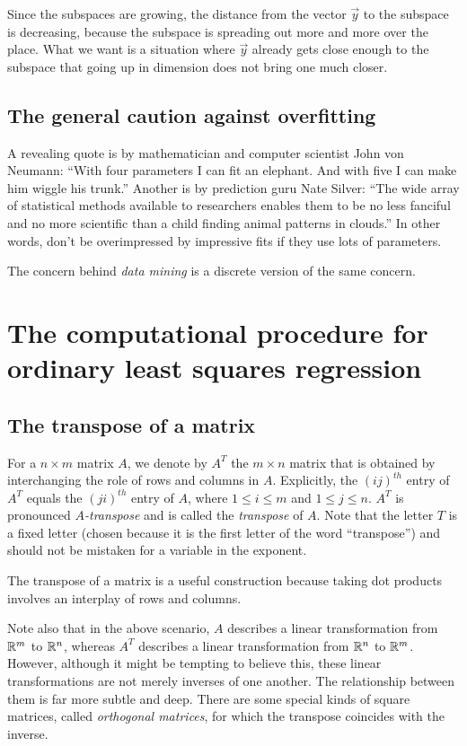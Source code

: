 \documentclass[10pt]{amsart}
\begin{document}
Since the subspaces are growing, the distance from the vector
$\vec{y}$ to the subspace is decreasing, because the subspace is
spreading out more and more over the place. What we want is a
situation where $\vec{y}$ already gets close enough to the subspace
that going up in dimension does not bring one much closer.

\subsection{The general caution against overfitting}

A revealing quote is by mathematician and computer scientist John von
Neumann: ``With four parameters I can fit an elephant. And with five I
can make him wiggle his trunk.''  Another is by prediction guru Nate
Silver: ``The wide array of statistical methods available to
researchers enables them to be no less fanciful and no more scientific
than a child finding animal patterns in clouds.'' In other words,
don't be overimpressed by impressive fits if they use lots of
parameters.

The concern behind {\em data mining} is a discrete version of the same
concern.

\section{The computational procedure for ordinary least squares regression}

\subsection{The transpose of a matrix}

For a $n \times m$ matrix $A$, we denote by $A^T$ the $m \times n$
matrix that is obtained by interchanging the role of rows and columns
in $A$. Explicitly, the $(ij)^{th}$ entry of $A^T$ equals the
$(ji)^{th}$ entry of $A$, where $1 \le i \le m$ and $1 \le j \le
n$. $A^T$ is pronounced {\em $A$-transpose} and is called the {\em
  transpose} of $A$. Note that the letter $T$ is a fixed letter
(chosen because it is the first letter of the word ``transpose'') and
should not be mistaken for a variable in the exponent.

The transpose of a matrix is a useful construction because taking dot
products involves an interplay of rows and columns.

Note also that in the above scenario, $A$ describes a linear
transformation from $\mathbb{R}^m$ to $\mathbb{R}^n$, whereas $A^T$ describes a linear
transformation from $\mathbb{R}^n$ to $\mathbb{R}^m$. However, although it might be
tempting to believe this, these linear transformations are not merely
inverses of one another. The relationship between them is far more
subtle and deep. There are some special kinds of square matrices,
called {\em orthogonal matrices}, for which the transpose coincides
with the inverse.
\end{document}

